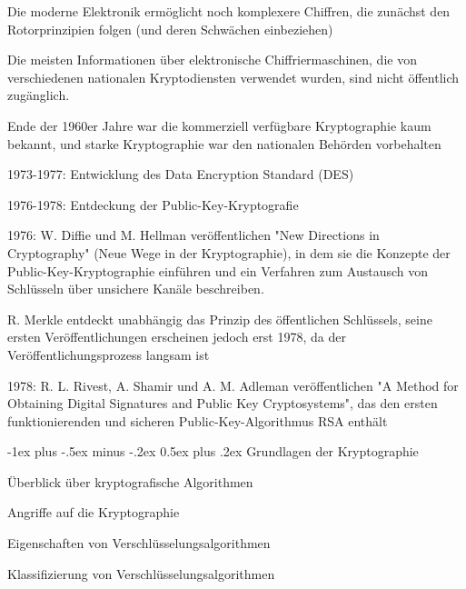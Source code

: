 \documentclass[a4paper]{article}
\makeatletter
\renewcommand{\section}{\@startsection{section}{1}{0mm}%
 {-1ex plus -.5ex minus -.2ex}%
 {0.5ex plus .2ex}%
 {\normalfont\large\bfseries}}
\makeatother
\begin{document}
\begin{multicols}{3}
\begin{itemize*}
            \begin{itemize*}
                  \item Die moderne Elektronik ermöglicht noch komplexere Chiffren, die zunächst den Rotorprinzipien folgen (und deren Schwächen einbeziehen)
                  \item Die meisten Informationen über elektronische Chiffriermaschinen, die von verschiedenen nationalen Kryptodiensten verwendet wurden, sind nicht öffentlich zugänglich.
                  \item Ende der 1960er Jahre war die kommerziell verfügbare Kryptographie kaum bekannt, und starke Kryptographie war den nationalen Behörden vorbehalten
                  \item 1973-1977: Entwicklung des Data Encryption Standard (DES)
                  \item 1976-1978: Entdeckung der Public-Key-Kryptografie
                  \item 1976: W. Diffie und M. Hellman veröffentlichen "New Directions in Cryptography" (Neue Wege in der Kryptographie), in dem sie die Konzepte der Public-Key-Kryptographie einführen und ein Verfahren zum Austausch von Schlüsseln über unsichere Kanäle beschreiben.
                  \item R. Merkle entdeckt unabhängig das Prinzip des öffentlichen Schlüssels, seine ersten Veröffentlichungen erscheinen jedoch erst 1978, da der Veröffentlichungsprozess langsam ist
                  \item 1978: R. L. Rivest, A. Shamir und A. M. Adleman veröffentlichen "A Method for Obtaining Digital Signatures and Public Key Cryptosystems", das den ersten funktionierenden und sicheren Public-Key-Algorithmus RSA enthält
            \end{itemize*}
      \end{itemize*}


      \section{Grundlagen der
        Kryptographie}

      \begin{itemize*}
            \item
            Überblick über kryptografische Algorithmen
            \item
            Angriffe auf die Kryptographie
            \item
            Eigenschaften von Verschlüsselungsalgorithmen
            \item
            Klassifizierung von Verschlüsselungsalgorithmen
      \end{itemize*}



\end{multicols}
\end{document}
